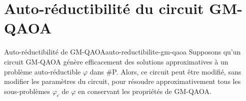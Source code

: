 \begin{comment}
\end{comment}


\chapter{Auto-réductibilité du circuit GM-QAOA}
\label{ann:auto-reductibilite-du-circuit-gm-qaoa}


\begin{maintheorem}{Auto-réductibilité de GM-QAOA}{auto-reductibilite-gm-qaoa}
    Supposons qu'un circuit GM-QAOA génère efficacement des solutions approximatives à un problème auto-réductible $\varphi$ dans \textsf{\#P}. Alors, ce circuit peut être modifié, sans modifier les paramètres du circuit, pour résoudre approximativement tous les sous-problèmes $\varphi_{c}$ de $\varphi$ en conservant les propriétés de GM-QAOA.
\end{maintheorem}

